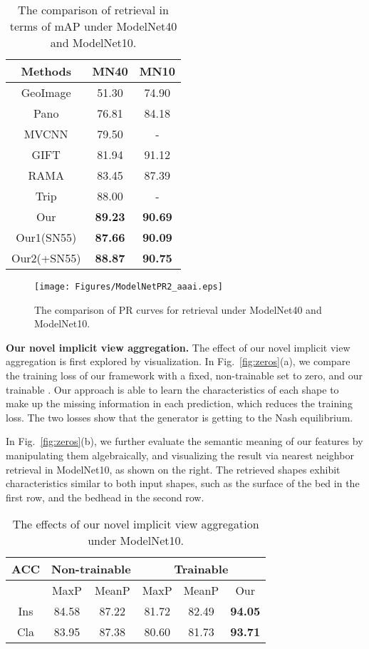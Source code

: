 \documentclass[letterpaper]{article} \usepackage{aaai19}  \usepackage{times}  \usepackage{helvet}  \usepackage{courier}  \usepackage{url}  \usepackage{graphicx}
\begin{document}
\begin{table}
  \caption{The comparison of retrieval in terms of mAP under ModelNet40 and ModelNet10.}
  \label{table:retrieval}
  \centering
  \begin{tabular}{ccc}\hline
    Methods & MN40 & MN10 \\
    \hline
    GeoImage & 51.30& 74.90  \\
    Pano & 76.81 & 84.18 \\
    MVCNN & 79.50 & -  \\
    GIFT & 81.94 & 91.12 \\
    RAMA & 83.45 & 87.39 \\
    Trip & 88.00 & - \\
    \hline
    Our & \textbf{89.23} & \textbf{90.69} \\
    Our1(SN55) & \textbf{87.66} & \textbf{90.09}\\
    Our2(+SN55) & \textbf{88.87} & \textbf{90.75} \\
    \hline
  \end{tabular}
\end{table}

\begin{figure}[!]
  \centering
\texttt{[image: Figures/ModelNetPR2\_aaai.eps]}
\caption{\label{fig:retrieval} The comparison of PR curves for retrieval under ModelNet40 and ModelNet10.}
\end{figure}

\noindent\textbf{Our novel implicit view aggregation. }The effect of our novel implicit view aggregation is first explored by visualization. In Fig.~\ref{fig:zeros}(a), we compare the training loss of our framework with a fixed, non-trainable  set to zero, and our trainable . Our approach is able to learn the characteristics of each shape to make up the missing information in each prediction, which reduces the training loss. The two losses show that the generator is getting to the Nash equilibrium.


In Fig.~\ref{fig:zeros}(b), we further evaluate the semantic meaning of our features by manipulating them algebraically, and visualizing the result via nearest neighbor retrieval in ModelNet10, as shown on the right. The retrieved shapes exhibit characteristics similar to both input shapes, such as the surface of the bed in the first row, and the bedhead in the second row.


\begin{table}
  \caption{The effects of our novel implicit view aggregation under ModelNet10.}
  \label{table:implicitcompare}
  \centering
  \begin{tabular}{c|c|c|c|c|c}\hline
       ACC&\multicolumn{2}{|c|}{Non-trainable }&\multicolumn{3}{c}{Trainable }\\
    \hline
     & MaxP&MeanP&MaxP&MeanP&Our\\
     \hline
     Ins&84.58&87.22&81.72&82.49&\textbf{94.05}\\
     Cla&83.95&87.38&80.60&81.73&\textbf{93.71}\\
    \hline
  \end{tabular}
\end{table}
\end{document}

